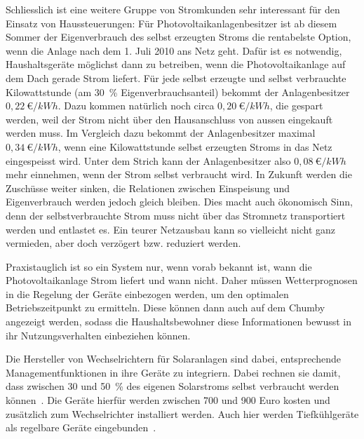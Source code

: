 \documentclass[12pt,BCOR=8.5mm]{scrartcl}
\begin{document}
Schliesslich ist eine weitere Gruppe von Stromkunden sehr interessant
für den Einsatz von Haussteuerungen: Für Photovoltaikanlagenbesitzer ist
ab diesem Sommer der Eigenverbrauch des selbst erzeugten Stroms die
rentabelste Option, wenn die Anlage nach dem 1. Juli 2010 ans Netz geht.
Dafür ist es notwendig, Haushaltsgeräte möglichst dann zu betreiben,
wenn die Photovoltaikanlage auf dem Dach gerade Strom liefert. Für jede
selbst erzeugte und selbst verbrauchte Kilowattstunde (am 30~\%
Eigenverbrauchsanteil) bekommt der Anlagenbesitzer $0,22~{\euro}/{kWh}$.  Dazu
kommen natürlich noch circa $0,20~{\euro}/{kWh}$, die gespart werden, weil der
Strom nicht über den Hausanschluss von aussen eingekauft werden muss. Im
Vergleich dazu bekommt der Anlagenbesitzer maximal $0,34~{\euro}/{kWh}$, wenn
eine Kilowattstunde selbst erzeugten Stroms in das Netz eingespeisst
wird.  Unter dem Strich kann der Anlagenbesitzer also $0,08
~{\euro}/{kWh}$ mehr
einnehmen, wenn der Strom selbst verbraucht wird. In Zukunft werden die
Zuschüsse weiter sinken, die Relationen zwischen Einspeisung und
Eigenverbrauch werden jedoch gleich bleiben. Dies macht auch ökonomisch
Sinn, denn der selbstverbrauchte Strom muss nicht über das Stromnetz
transportiert werden und entlastet es. Ein teurer Netzausbau kann so
vielleicht nicht ganz vermieden, aber doch verzögert bzw.  reduziert
werden.

Praxistauglich ist so ein System nur, wenn vorab bekannt ist, wann die
Photovoltaikanlage Strom liefert und wann nicht. Daher müssen
Wetterprognosen in die Regelung der Geräte einbezogen werden, um den
optimalen Betriebszeitpunkt zu ermitteln. Diese können dann auch auf dem
Chumby angezeigt werden, sodass die Haushaltsbewohner diese
Informationen bewusst in ihr Nutzungsverhalten einbeziehen können.

Die Hersteller von Wechselrichtern für Solaranlagen sind dabei,
entsprechende Managementfunktionen in ihre Geräte zu integriern. Dabei
rechnen sie damit, dass zwischen 30 und 50~\% des eigenen Solarstroms
selbst verbraucht werden können~\cite{ossenbrinck10herstellung}. Die
Geräte hierfür werden zwischen 700 und 900 Euro kosten und zusätzlich
zum Wechselrichter installiert werden. Auch hier werden Tiefkühlgeräte
als regelbare Geräte eingebunden~\cite{ossenbrinck10herstellung}.

%
%
%
%
\end{document}
